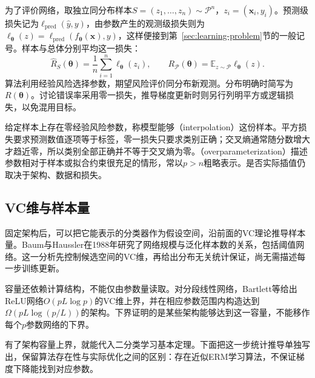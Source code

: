 为了评价网络，取独立同分布样本$S=(z_1,\ldots,z_n)\sim\mathcal P^n$，$z_i=(\bm x_i,y_i)$。预测级损失记为$\ell_{\mathrm{pred}}(\widehat y,y)$，由参数产生的观测级损失则为$\ell_{\bm\theta}(z)=\ell_{\mathrm{pred}}(f_{\bm\theta}(\bm x),y)$，这样便接到第~\ref{sec:learning-problem}节的一般记号。样本与总体分别平均这一损失：
\[
 \hat R_S(\bm\theta)=\frac1n\sum_{i=1}^n\ell_{\bm\theta}(z_i),
 \qquad
 R_{\mathcal P}(\bm\theta)=\mathbb E_{z\sim\mathcal P}\ell_{\bm\theta}(z).
\]
算法利用经验风险选择参数，期望风险评价同分布新观测。分布明确时简写为$R(\bm\theta)$。讨论错误率采用零一损失，推导梯度更新时则另行列明平方或逻辑损失，以免混用目标。

给定样本上存在零经验风险参数，称模型能够（interpolation）这份样本。平方损失要求预测数值逐项等于标签，零一损失只要求类别正确；交叉熵通常随分数增大才趋近零，所以类别全部正确并不等于交叉熵为零。（overparameterization）描述参数相对于样本或拟合约束很充足的情形，常以$p>n$粗略表示。是否实际插值仍取决于架构、数据和损失。

\subsection{VC维与样本量}

固定架构后，可以把它能表示的分类器作为假设空间，沿前面的VC理论推导样本量。Baum与Haussler在1988年研究了网络规模与泛化样本数的关系，包括阈值网络。这一分析先控制候选空间的VC维，再给出分布无关统计保证，尚无需描述每一步训练更新。

容量还依赖计算结构，不能仅由参数量读取。对分段线性网络，Bartlett等给出ReLU网络$O(pL\log p)$的VC维上界，并在相应参数范围内构造达到$\Omega(pL\log(p/L))$的架构。下界证明的是某些架构能够达到这一容量，不能移作每个$p$参数网络的下界。

有了架构容量上界，就能代入二分类学习基本定理。下面把这一步统计推导单独写出，保留算法存在性与实际优化之间的区别：存在近似ERM学习算法，不保证梯度下降能找到对应参数。


